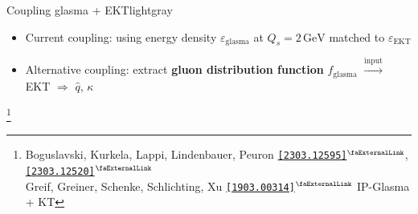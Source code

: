\documentclass[aspectratio=169,11pt,usenames,dvipsnames]{beamer}
\renewcommand{\thefootnote}{\color{customblue}\faPaperPlaneO}
\newcommand\blfootnote[1]{%
  \begingroup
  \renewcommand\thefootnote{}\footnote{#1}%
  \addtocounter{footnote}{-1}%
  \endgroup
}
\begin{document}
\begin{frame}
\begin{center}
\begin{columns}
        \end{columns}
    \end{center}
    \vspace{-10pt}
   \begin{center}
    \begin{custombox2}{Coupling glasma + EKT}{lightgray}
        \small
        \begin{varwidth}{0.9\textwidth}
        \begin{itemize}\itemsep0em 
            \item Current coupling: using energy density $\varepsilon_\mathrm{glasma}$ at $Q_s=2\,\mathrm{GeV}$ matched to $\varepsilon_\mathrm{EKT}$ 
            \item Alternative coupling: extract {\bfseries\color{palgold} gluon distribution function} $f_{\mathrm{glasma}}$ $\xrightarrow{\text{input}}$ EKT $\Rightarrow$ $\hat{q}$, $\kappa$
        \end{itemize}
        \end{varwidth}
    \end{custombox2}
   \end{center} 
   \vspace{-5pt}
    \blfootnote{\scriptsize Boguslavski, Kurkela, Lappi, Lindenbauer, Peuron \href{https://arxiv.org/abs/2303.12595}{{\color{palgold}\texttt{[2303.12595]}$^\text{\scalebox{0.9}{\faExternalLink}}$}}, \href{https://arxiv.org/abs/2303.12520}{{\color{palgold}\texttt{[2303.12520]}$^\text{\scalebox{0.9}{\faExternalLink}}$}}\\
    \hspace{16.5pt}Greif, Greiner, Schenke, Schlichting, Xu \href{https://arxiv.org/abs/1903.00314}{{\color{palviolet}\texttt{[1903.00314]}$^\text{\scalebox{0.9}{\faExternalLink}}$}} IP-Glasma + KT}
\end{frame}

\end{document}
